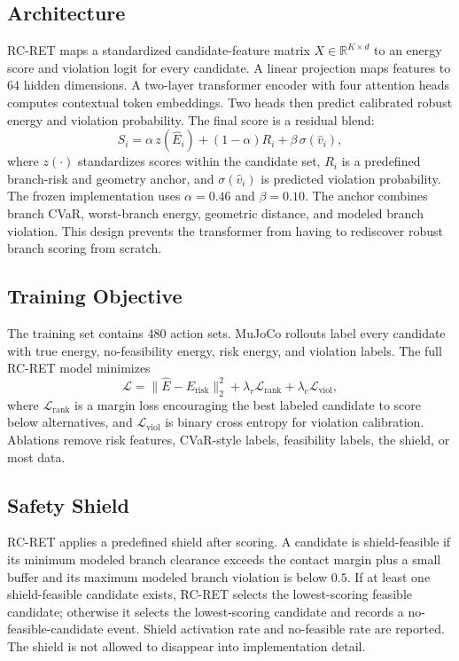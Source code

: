 \documentclass{article}
\newcommand{\method}{RC-RET}
\newcommand{\energy}{E}
\begin{document}
\subsection{Architecture}

\method{} maps a standardized candidate-feature matrix $X \in \mathbb{R}^{K \times d}$ to an energy score and violation logit for every candidate.  A linear projection maps features to 64 hidden dimensions.  A two-layer transformer encoder with four attention heads computes contextual token embeddings.  Two heads then predict calibrated robust energy and violation probability.  The final score is a residual blend:
\[
  S_i
  =
  \alpha \, z(\widehat{\energy}_i)
  + (1-\alpha) R_i
  + \beta \, \sigma(\widehat{v}_i),
\]
where $z(\cdot)$ standardizes scores within the candidate set, $R_i$ is a predefined branch-risk and geometry anchor, and $\sigma(\widehat{v}_i)$ is predicted violation probability.  The frozen implementation uses $\alpha=0.46$ and $\beta=0.10$.  The anchor combines branch CVaR, worst-branch energy, geometric distance, and modeled branch violation.  This design prevents the transformer from having to rediscover robust branch scoring from scratch.

\subsection{Training Objective}

The training set contains 480 action sets.  MuJoCo rollouts label every candidate with true energy, no-feasibility energy, risk energy, and violation labels.  The full \method{} model minimizes
\[
  \mathcal{L}
  =
  \|\widehat{\energy}-\energy_{\mathrm{risk}}\|_2^2
  + \lambda_r \mathcal{L}_{\mathrm{rank}}
  + \lambda_c \mathcal{L}_{\mathrm{viol}},
\]
where $\mathcal{L}_{\mathrm{rank}}$ is a margin loss encouraging the best labeled candidate to score below alternatives, and $\mathcal{L}_{\mathrm{viol}}$ is binary cross entropy for violation calibration.  Ablations remove risk features, CVaR-style labels, feasibility labels, the shield, or most data.

\subsection{Safety Shield}

\method{} applies a predefined shield after scoring.  A candidate is shield-feasible if its minimum modeled branch clearance exceeds the contact margin plus a small buffer and its maximum modeled branch violation is below $0.5$.  If at least one shield-feasible candidate exists, \method{} selects the lowest-scoring feasible candidate; otherwise it selects the lowest-scoring candidate and records a no-feasible-candidate event.  Shield activation rate and no-feasible rate are reported.  The shield is not allowed to disappear into implementation detail.
\end{document}

